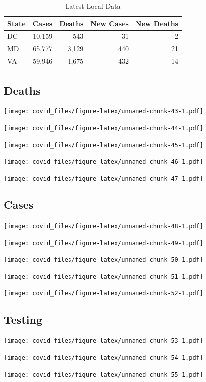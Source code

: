 \documentclass[]{article}
\begin{document}
\begin{table}[!h]

\caption{\label{tab:unnamed-chunk-42}Latest Local Data}
\centering
\begin{tabular}{l|r|r|r|r}
\hline
State & Cases & Deaths & New Cases & New Deaths\\
\hline
DC & 10,159 & 543 & 31 & 2\\
\hline
MD & 65,777 & 3,129 & 440 & 21\\
\hline
VA & 59,946 & 1,675 & 432 & 14\\
\hline
\end{tabular}
\end{table}

\newpage

\hypertarget{deaths-2}{%
\subsection{Deaths}\label{deaths-2}}

\texttt{[image: covid\_files/figure-latex/unnamed-chunk-43-1.pdf]}

\texttt{[image: covid\_files/figure-latex/unnamed-chunk-44-1.pdf]}

\texttt{[image: covid\_files/figure-latex/unnamed-chunk-45-1.pdf]}

\texttt{[image: covid\_files/figure-latex/unnamed-chunk-46-1.pdf]}

\texttt{[image: covid\_files/figure-latex/unnamed-chunk-47-1.pdf]}

\newpage

\hypertarget{cases-2}{%
\subsection{Cases}\label{cases-2}}

\texttt{[image: covid\_files/figure-latex/unnamed-chunk-48-1.pdf]}

\texttt{[image: covid\_files/figure-latex/unnamed-chunk-49-1.pdf]}

\texttt{[image: covid\_files/figure-latex/unnamed-chunk-50-1.pdf]}

\texttt{[image: covid\_files/figure-latex/unnamed-chunk-51-1.pdf]}

\texttt{[image: covid\_files/figure-latex/unnamed-chunk-52-1.pdf]}

\newpage

\hypertarget{testing-2}{%
\subsection{Testing}\label{testing-2}}

\texttt{[image: covid\_files/figure-latex/unnamed-chunk-53-1.pdf]}

\texttt{[image: covid\_files/figure-latex/unnamed-chunk-54-1.pdf]}

\texttt{[image: covid\_files/figure-latex/unnamed-chunk-55-1.pdf]}
\end{document}
